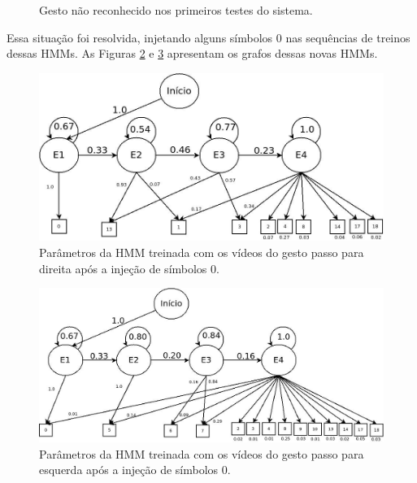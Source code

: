 \begin{figure}[!htbp]
  \caption{Gesto não reconhecido nos primeiros testes do sistema.}
  \label{img:andar_from_parado}
\end{figure}


Essa situação foi resolvida, injetando alguns símbolos 0 nas sequências de treinos dessas HMMs. As Figuras \ref{img:HMM_1_apos_treino_2} e \ref{img:HMM_2_apos_treino_2} apresentam os grafos dessas novas HMMs.

\begin{figure}[!htbp]
  \center
  \includegraphics[scale=0.35]{imagens/HMM_1_apos_treino_2.jpg}
  \caption{Parâmetros da HMM treinada com os vídeos do gesto passo para direita após a injeção de símbolos 0.}
  \label{img:HMM_1_apos_treino_2}
\end{figure}

\begin{figure}[!htbp]
  \center
  \includegraphics[scale=0.35]{imagens/HMM_2_apos_treino_2.jpg}
  \caption{Parâmetros da HMM treinada com os vídeos do gesto passo para esquerda após a injeção de símbolos 0.}
  \label{img:HMM_2_apos_treino_2}
\end{figure}


